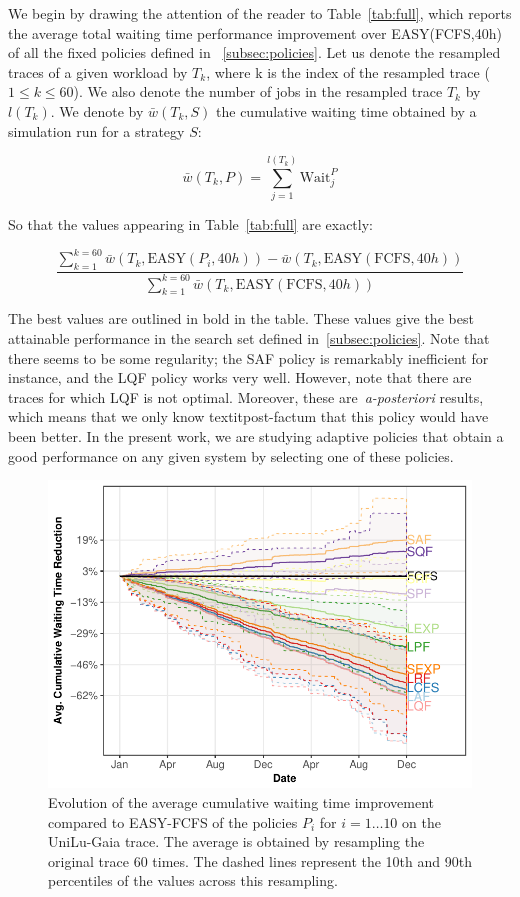 \documentclass[sigconf,anonymous]{acmart}
\begin{document}
We begin by drawing the attention of the reader to Table~\ref{tab:full}, which
reports the average total waiting time performance improvement over
EASY(FCFS,40h) of all the fixed policies defined in ~\ref{subsec:policies}. Let
us denote the resampled traces of a given workload by $T_k$, where k is the
index of the resampled trace ($1 \le k \le 60$). We also denote the number of
jobs in the resampled trace $T_k$ by $l(T_k)$. We denote by $\bar{w}(T_k,S)$
the cumulative waiting time obtained by a simulation run for a strategy $S$:

\begin{equation}
  \bar{w}(T_k,P) = \sum_{j=1}^{l(T_k)} \text{Wait}_j^{P}
\end{equation}

So that the values appearing in Table~\ref{tab:full} are exactly:

\begin{equation}
  \label{ref:cum}
  \frac{\sum_{k=1}^{k=60}\bar{w}(T_k,\text{EASY}(P_i,40h))-
  \bar{w}(T_k,\text{EASY}(\text{FCFS},40h))}{\sum_{k=1}^{k=60}\bar{w}(T_k,\text{EASY}(\text{FCFS},40h))}
\end{equation}

The best values are outlined in bold in the table. These values give the best
attainable performance in the search set defined in~\ref{subsec:policies}.
Note that there seems to be some regularity; the SAF policy is remarkably
inefficient for instance, and the LQF policy works very well. However, note
that there are traces for which LQF is not optimal. Moreover, these
are~\textit{a-posteriori} results, which means that we only know
textit{post-factum} that this policy would have been better. In the present
work, we are studying adaptive policies that obtain a good performance on any
given system by selecting one of these policies.

\begin{figure}[]
  \centering
  \includegraphics[scale=0.6]{figures/full-UniLu-Ga.pdf}
  \caption{Evolution of the average cumulative waiting time improvement
    compared to EASY-FCFS of the policies $P_i$ for $i = 1 \ldots 10$ on the
    UniLu-Gaia trace. The average is obtained by resampling the original trace
    60 times. The dashed lines represent the 10th and 90th percentiles of the
  values across this resampling.}
  \label{fig:all}
\end{figure}
\end{document}
